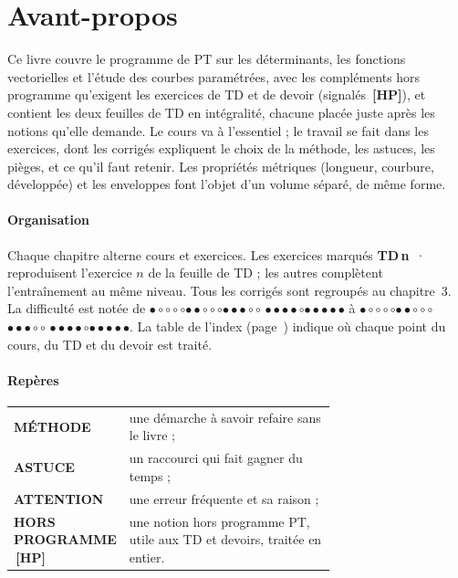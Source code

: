 \documentclass[a4paper,11pt]{article}
\numberwithin{equation}{section}
\numberwithin{figure}{section}
\numberwithin{table}{section}
\theoremstyle{enonce}
\theoremstyle{exemple}
\theoremstyle{remarque}
\newcommand{\niveau}[1]{{\color{Ocre}\footnotesize
  \ifcase#1\or$\bullet\circ\circ\circ\circ$\or$\bullet\bullet\circ\circ\circ$\or$\bullet\bullet\bullet\circ\circ$%
  \or$\bullet\bullet\bullet\bullet\circ$\or$\bullet\bullet\bullet\bullet\bullet$\fi}}
\newcommand{\HP}{\,{\sffamily\bfseries\scriptsize\textcolor{Brique}{[HP]}}}
\newcommand{\TD}[1]{{\color{Ocre}\bfseries TD\,#1}\ ·\ }
\begin{document}
\thispagestyle{plain}
\section*{Avant-propos}

Ce livre couvre le programme de PT sur les déterminants, les fonctions vectorielles et l'étude des courbes paramétrées, avec
les compléments hors programme qu'exigent les exercices de TD et de devoir (signalés \HP), et contient les deux feuilles de
TD en intégralité, chacune placée juste après les notions qu'elle demande. Le cours va à l'essentiel ; le travail se fait
dans les exercices, dont les corrigés expliquent le choix de la méthode, les astuces, les pièges, et ce qu'il faut retenir. Les propriétés métriques (longueur, courbure, développée) et les enveloppes font l'objet d'un volume
séparé, de même forme.

\paragraph{Organisation} Chaque chapitre alterne cours et exercices. Les exercices marqués \TD{n} reproduisent l'exercice
$n$ de la feuille de TD ; les autres complètent l'entraînement au même niveau. Tous les corrigés sont regroupés au
chapitre~3. La difficulté est notée de \niveau{1} à \niveau{5}. La table de l'index (page~\pageref{sec:corresp}) indique où
chaque point du cours, du TD et du devoir est traité.

\paragraph{Repères}
\begin{center}
\renewcommand{\arraystretch}{1.25}\small
\begin{tabular}{>{\sffamily\bfseries\footnotesize}l p{0.7\linewidth}}
\colorbox{Bleu}{\color{white}MÉTHODE} & une démarche à savoir refaire sans le livre ;\\
\color{Ocre}ASTUCE & un raccourci qui fait gagner du temps ;\\
\color{Brique}ATTENTION & une erreur fréquente et sa raison ;\\
\color{Brique}HORS PROGRAMME \HP & une notion hors programme PT, utile aux TD et devoirs, traitée en entier.\\
\end{tabular}
\end{center}
\end{document}
